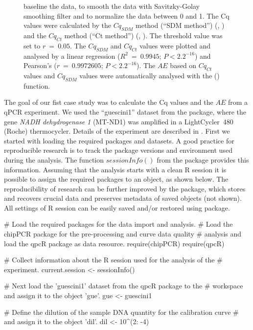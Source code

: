 \begin{figure}[htbp]
{baseline the data, to smooth the data with Savitzky-Golay smoothing filter and 
to normalize the data between 0 and 1.  The Cq values were 
calculated by the $Cq_{SDM}$ method (``SDM method'') (, 
) and the $Cq_{Ct}$ method (``Ct method'') (, 
). The threshold value was set to $r~=~0.05$. The $Cq_{SDM}$ 
and $Cq_{Ct}$ values were plotted and analysed by a linear regression 
($R^{2}~=~0.9945$; $P < 2.2^{-16}$) and Pearson's ($r~=~0.9972605$; $P < 
2.2^{-16}$). The $AE$ based on  $Cq_{Ct}$ values and  
$Cq_{SDM}$ values were automatically analysed with the  
() function.}
  \label{figure:dilution_Cq}
\end{figure}

The goal of our fist case study was to calculate the Cq values and the $AE$ 
from 
a qPCR experiment. We used the ``guescini1'' dataset from the  
package, where the gene \textit{NADH dehydrogenase 1} (MT-ND1) was amplified in 
a LightCycler\circledR~480 (Roche) thermocycler. Details of the experiment are 
described in \citet{guescini_2008}. First we started with loading the required 
packages and datasets. A good practice for reproducible research is to track 
the 
package versions and environment used during the analysis. The function 
$sessionInfo()$ from the  package provides this information. 
Assuming that the analysis starts with a clean R session it is possible to 
assign the required packages to an object, as shown below. The reproducibility 
of research can be further improved by the  package, which 
stores and recovers crucial data and preserves metadata of saved objects (not 
shown). All settings of R session can be easily saved and/or restored using 
 package.

\begin{example}
# Load the required packages for the data import and analysis.
# Load the chipPCR package for the pre-processing and curve data quality
# analysis and load the qpcR package as data resource.
require(chipPCR)
require(qpcR)

# Collect information about the R session used for the analysis of the
# experiment.
current.session <- sessionInfo()

# Next load the 'guescini1' dataset from the qpcR package to the
# workspace and assign it to the object 'gue'.
gue <- guescini1

# Define the dilution of the sample DNA quantity for the calibration curve 
# and assign it to the object 'dil'.
dil <- 10^(2: -4)
\end{example}

